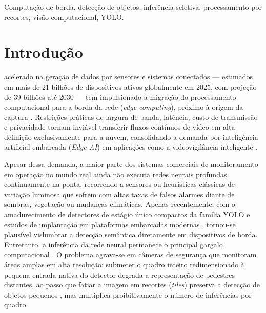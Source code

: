 \documentclass{ieeeaccess}
\begin{document}
\begin{keywords}
    Computação de borda, detecção de objetos, inferência seletiva, processamento por recortes, visão computacional, YOLO.
\end{keywords}

\titlepgskip=-15pt

\maketitle

\section{Introdução}
\label{sec:introducao}

 acelerado na geração de dados por sensores e sistemas conectados --- estimados em mais de 21 bilhões de dispositivos ativos globalmente em 2025, com projeção de 39 bilhões até 2030 \cite{iotanalytics2025devices, idc2018datage} --- tem impulsionado a migração do processamento computacional para a borda da rede (\textit{edge computing}), próximo à origem da captura \cite{shi2016edge, zhou2019edge}. Restrições práticas de largura de banda, latência, custo de transmissão e privacidade tornam inviável transferir fluxos contínuos de vídeo em alta definição exclusivamente para a nuvem, consolidando a demanda por inteligência artificial embarcada (\textit{Edge AI}) em aplicações como a videovigilância inteligente \cite{bcc2025edgeai, mnm2024videosurveillance}.

Apesar dessa demanda, a maior parte dos sistemas comerciais de monitoramento em operação no mundo real ainda não executa redes neurais profundas continuamente na ponta, recorrendo a sensores ou heurísticas clássicas de variação luminosa que sofrem com altas taxas de falsos alarmes diante de sombras, vegetação ou mudanças climáticas. Apenas recentemente, com o amadurecimento de detectores de estágio único compactos da família YOLO \cite{redmon2016yolo, terven2023yolo} e estudos de implantação em plataformas embarcadas modernas \cite{kong2026edgesocs, shalash2026benchmark}, tornou-se plausível vislumbrar a detecção semântica diretamente em dispositivos de borda. Entretanto, a inferência da rede neural permanece o principal gargalo computacional \cite{chen2019dl, kong2026edgesocs}. O problema agrava-se em câmeras de segurança que monitoram áreas amplas em alta resolução: submeter o quadro inteiro redimensionado à pequena entrada nativa do detector degrada a representação de pedestres distantes, ao passo que fatiar a imagem em recortes (\textit{tiles}) preserva a detecção de objetos pequenos \cite{akyon2022sahi}, mas multiplica proibitivamente o número de inferências por quadro.
\end{document}
